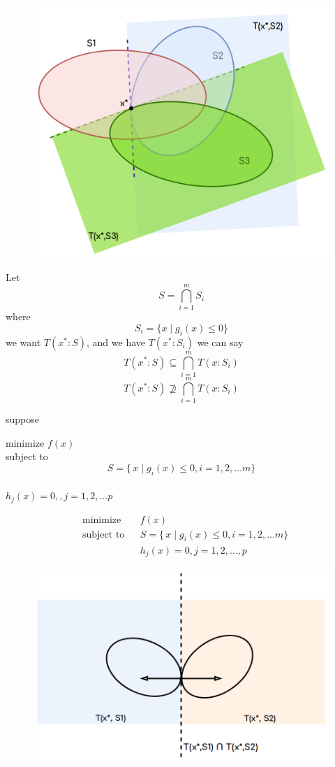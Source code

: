 \documentclass[twoside]{article}
\DeclareMathOperator{\minimize}{minimize}
\DeclareMathOperator{\subjectto}{subject\ to}
\begin{document}
\begin{figure}[h]
\center
\includegraphics[scale=0.25]{images/pic5.png}
\end{figure}
Let $$S = \bigcap^{m}_{i=1}S_i$$ where $$S_i = \{ x\mid g_i(x)\leq 0\}$$
we want $T(x^*:S)$, and we have $T(x^*:S_i)$
we can say $$T(x^*:S) \subseteq \bigcap_{i=1}^{m}T(x:S_i)$$
$$T(x^*:S)\nsupseteq \bigcap_{i=1}^{m}T(x:S_i)$$

suppose 
\begin{center}
minimize $f(x)$\\
subject to $$S = \{\,x\mid g_{i}(x)\leq 0 , i = 1,2,...m\}$$\\
$h_j(x) = 0, , j = 1,2,...p$
\end{center}

\begin{equation}
\begin{aligned}
& \minimize && f(x)\\
& \subjectto && S = \{\,x\mid g_{i}(x)\leq 0 , i = 1,2,...m\}\\
&&& h_j(x) = 0, j = 1,2, \ldots, p
\end{aligned}
\end{equation}

\begin{figure}[h]
\center
\includegraphics[scale=0.25]{images/pic6.png}
\end{figure}
\end{document}
